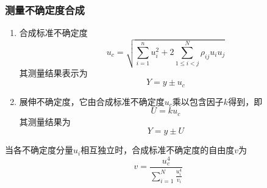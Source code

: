 \subsubsection{测量不确定度合成}
\begin{enumerate}
	\item 合成标准不确定度\begin{equation} u_c=\sqrt{\sum_{i=1}^{n}u_i^2+2\sum_{1\le i<j}^{N}\rho_{ij}u_iu_j} \end{equation}
	其测量结果表示为\begin{equation} Y=y\pm u_c \end{equation}
	\item 展伸不确定度，它由合成标准不确定度$ u_c $乘以包含因子$ k $得到，即\begin{equation} U=ku_c \end{equation}
	其测量结果为\begin{equation} Y=y\pm U \end{equation}
\end{enumerate}
当各不确定度分量$ u_i $相互独立时，合成标准不确定度的自由度$ v $为\begin{equation} v=\frac{u_c^4}{\sum\limits_{i=1}^{N}\frac{u_i^4}{v_i}} \end{equation}
